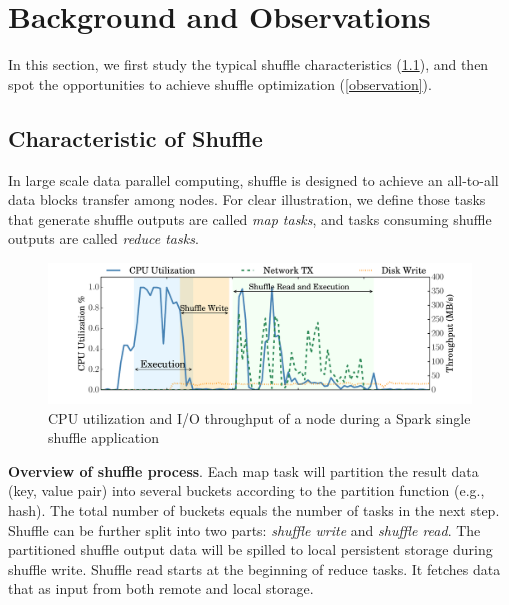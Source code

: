 \section{Background and Observations}

In this section, we first study the typical shuffle characteristics (\ref{shuffle pattern}), and then spot the opportunities to achieve shuffle optimization (\ref{observation}).
\subsection{Characteristic of Shuffle} \label{shuffle pattern}

In large scale data parallel computing, shuffle is designed to achieve an all-to-all data blocks transfer among nodes. For clear illustration, we define those tasks that generate shuffle outputs are called \textit{map tasks}, and tasks consuming shuffle outputs are called \textit{reduce tasks}.

\begin{figure}
	\includegraphics[width=\linewidth]{fig/util}
	\caption{CPU utilization and I/O throughput of a node during a Spark single shuffle application}
	\label{fig:util}
\end{figure}

\textbf{Overview of shuffle process}. Each map task will partition the result data (key, value pair) into several buckets according to the partition function (e.g., hash). The total number of buckets equals the number of tasks in the next step.
Shuffle can be further split into two parts: \textit{shuffle write} and \textit{shuffle read}. 
The partitioned shuffle output data will be spilled to local persistent storage during shuffle write.
Shuffle read starts at the beginning of reduce tasks. It fetches data that as input from both remote and local storage.

